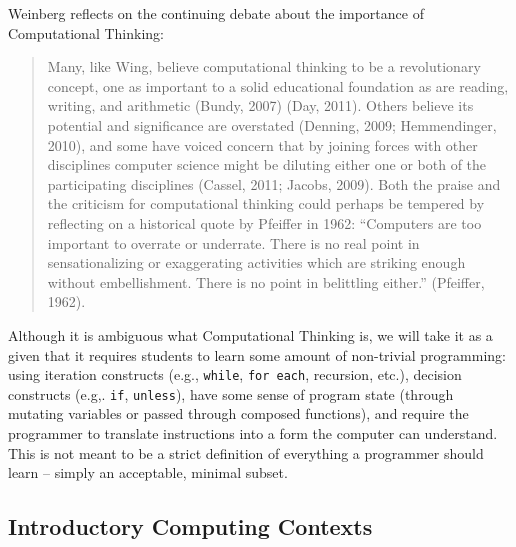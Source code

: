 Weinberg reflects on the continuing debate about the importance of Computational Thinking:
\begin{quote}
    Many, like Wing, believe computational thinking to be a revolutionary concept, one as 
important to a solid educational foundation as are reading, writing, and arithmetic (Bundy, 2007\cite{bundy2007}) 
(Day, 2011\cite{day2011}). Others believe its potential and significance are overstated (Denning, 2009\cite{denning2009}; 
Hemmendinger, 2010\cite{hemmendinger2010}), and some have voiced concern that by joining forces with other 
disciplines computer science might be diluting either one or both of the participating disciplines 
(Cassel, 2011\cite{cassel2011}; Jacobs, 2009\cite{jacobs2009}). Both the praise and the criticism for computational thinking could 
perhaps be tempered by reflecting on a historical quote by Pfeiffer in 1962: “Computers are too 
important to overrate or underrate. There is no real point in sensationalizing or exaggerating 
activities which are striking enough without embellishment. There is no point in belittling 
either.” (Pfeiffer, 1962\cite{pfeiffer1962}).
\end{quote}

Although it is ambiguous what Computational Thinking is, we will take it as a given that it requires students to learn some amount of non-trivial programming: using iteration constructs (e.g., \texttt{while}, \texttt{for each}, recursion, etc.), decision constructs (e.g,. \texttt{if}, \texttt{unless}), have some sense of program state (through mutating variables or passed through composed functions), and require the programmer to translate instructions into a form the computer can understand.
This is not meant to be a strict definition of everything a programmer should learn -- simply an acceptable, minimal subset.

\subsection{Introductory Computing Contexts}


